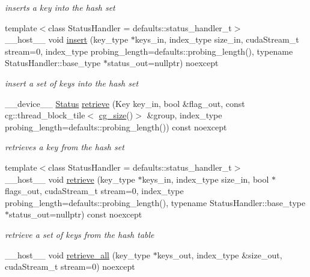 \begin{DoxyCompactItemize}
\begin{DoxyCompactList}\small\item\em inserts a key into the hash set \end{DoxyCompactList}\item 
{\footnotesize template$<$class Status\+Handler  = defaults\+::status\+\_\+handler\+\_\+t$>$ }\\\+\_\+\+\_\+host\+\_\+\+\_\+ void \hyperlink{classwarpcore_1_1HashSet_a126cbcc9e5354c545dcc900efa3a2949}{insert} (key\+\_\+type $\ast$keys\+\_\+in, index\+\_\+type size\+\_\+in, cuda\+Stream\+\_\+t stream=0, index\+\_\+type probing\+\_\+length=defaults\+::probing\+\_\+length(), typename Status\+Handler\+::base\+\_\+type $\ast$status\+\_\+out=nullptr) noexcept
\begin{DoxyCompactList}\small\item\em insert a set of keys into the hash set \end{DoxyCompactList}\item 
\+\_\+\+\_\+device\+\_\+\+\_\+ \hyperlink{classwarpcore_1_1Status}{Status} \hyperlink{classwarpcore_1_1HashSet_a3be33bdea6aabe4075b7e6f9a3741021}{retrieve} (Key key\+\_\+in, bool \&flag\+\_\+out, const cg\+::thread\+\_\+block\+\_\+tile$<$ \hyperlink{classwarpcore_1_1HashSet_a0906259ae0be4a4f6f9ba74b4874e542}{cg\+\_\+size}()$>$ \&group, index\+\_\+type probing\+\_\+length=defaults\+::probing\+\_\+length()) const noexcept
\begin{DoxyCompactList}\small\item\em retrieves a key from the hash set \end{DoxyCompactList}\item 
{\footnotesize template$<$class Status\+Handler  = defaults\+::status\+\_\+handler\+\_\+t$>$ }\\\+\_\+\+\_\+host\+\_\+\+\_\+ void \hyperlink{classwarpcore_1_1HashSet_a717410da394a39128634784211bc644f}{retrieve} (key\+\_\+type $\ast$keys\+\_\+in, index\+\_\+type size\+\_\+in, bool $\ast$flags\+\_\+out, cuda\+Stream\+\_\+t stream=0, index\+\_\+type probing\+\_\+length=defaults\+::probing\+\_\+length(), typename Status\+Handler\+::base\+\_\+type $\ast$status\+\_\+out=nullptr) const noexcept
\begin{DoxyCompactList}\small\item\em retrieve a set of keys from the hash table \end{DoxyCompactList}\item 
\+\_\+\+\_\+host\+\_\+\+\_\+ void \hyperlink{classwarpcore_1_1HashSet_a65e1b3433df8a596bca8bbd0b084f804}{retrieve\+\_\+all} (key\+\_\+type $\ast$keys\+\_\+out, index\+\_\+type \&size\+\_\+out, cuda\+Stream\+\_\+t stream=0) noexcept

\end{DoxyCompactItemize}
